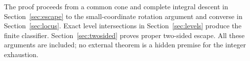 

The proof proceeds from a common cone and complete integral descent
in Section~\ref{sec:escape} to the small-coordinate rotation argument
and converse in Section~\ref{sec:locus}. Exact level intersections
in Section~\ref{sec:levels} produce the finite classifier.
Section~\ref{sec:twosided} proves proper two-sided escape. All these
arguments are included; no external theorem is a hidden premise
for the integer exhaustion.
